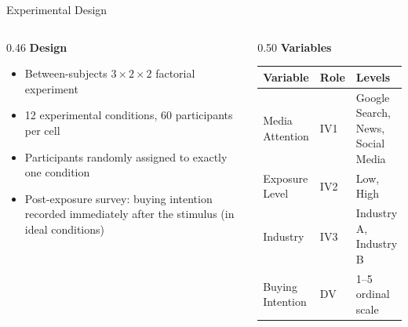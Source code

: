 \documentclass[aspectratio=169, 10pt]{beamer}
\begin{document}
\begin{frame}{Experimental Design}
  \begin{columns}[T]
    \begin{column}{0.46\textwidth}
      \textbf{Design}
      \vspace{0.4em}
      \begin{itemize}
        \setlength\itemsep{0.45em}
        \item Between-subjects $3 \times 2 \times 2$ factorial experiment
        \item 12 experimental conditions, 60 participants per cell
        \item Participants randomly assigned to exactly one condition
        \item Post-exposure survey: buying intention recorded immediately after the stimulus (in ideal conditions)
      \end{itemize}
    \end{column}
    \begin{column}{0.50\textwidth}
      \textbf{Variables}
      \vspace{0.4em}
      {\footnotesize
      \renewcommand{\arraystretch}{1.3}
      \begin{tabular}{p{2.1cm}p{0.65cm}p{2.7cm}}
        \toprule
        \textbf{Variable} & \textbf{Role} & \textbf{Levels} \\
        \midrule
        Media Attention & IV1 & Google Search, News, Social Media \\
        Exposure Level & IV2 & Low, High \\
        Industry & IV3 & Industry A, Industry B \\
        Buying Intention & DV & 1--5 ordinal scale \\
        \bottomrule
      \end{tabular}
      }
    \end{column}
  \end{columns}
\end{frame}
\end{document}
